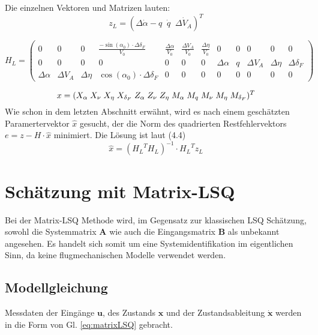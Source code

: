 Die einzelnen Vektoren und Matrizen lauten:
\setcounter{MaxMatrixCols}{15}
\begin{equation}
	z_{L} = (\Delta\dot \alpha-q \;\; \dot q \;\; \Delta\dot V_A)^T
\end{equation}

\begin{equation}
	 H_{L} = \begin{pmatrix}
		0&0&0& \frac{-\sin{(\alpha_0)}\cdot\Delta\delta_F}{V_0} & \frac{\Delta\alpha}{V_0}& \frac{\Delta V_A}{V_0} & 
		\frac{\Delta\eta}{V_0} &0&0&0&0&0   \\
		0&0&0&0&0&0&0 &\Delta\alpha & q & \Delta V_A & \Delta\eta & \Delta\delta_F \\
		\Delta\alpha &  \Delta V_A & \Delta\eta & \cos{(\alpha_0)}\cdot\Delta\delta_F &0&0&0&0&0&0&0&0 
	\end{pmatrix}
\end{equation}

\begin{equation}
	x = (X_{\alpha}\; 
	X_{\nu}\;
	X_{\eta}\;
	X_{\delta_F}\; 
	Z_{\alpha}\; 
	Z_{\nu}\;
	Z_{\eta}\;
	M_{\alpha}\;
	M_{q}\;
	M_{\nu}\;
	M_{\eta}\;
	M_{\delta_F})^T \\
\end{equation}  
Wie schon in dem letzten Abschnitt erwähnt, wird es nach einem geschätzten Paramertervektor $\hat{x}$ gesucht, der die Norm des quadrierten Restfehlervektors $ e = z - H\cdot \hat{x}$ minimiert. Die Lösung ist laut (4.4)
\begin{equation}
    \hat{x}= {({H_L}^{T} {H_L})}^{-1} \cdot {H_L}^{T} z_L 
\end{equation}


\section{Schätzung mit Matrix-LSQ}

Bei der Matrix-LSQ Methode wird, im Gegensatz zur klassischen LSQ Schätzung, sowohl die Systemmatrix \textbf{A} wie auch die Eingangsmatrix \textbf{B} als unbekannt angesehen. Es handelt sich somit um eine Systemidentifikation im eigentlichen Sinn, da keine flugmechanischen Modelle verwendet werden.

\subsection{Modellgleichung}

Messdaten der Eingänge $\textbf{u}$, des Zustands  $\textbf{x}$ und der Zustandsableitung $\dot{\textbf{x}}$ werden in die Form von Gl. \ref{eq:matrixLSQ} gebracht. 

